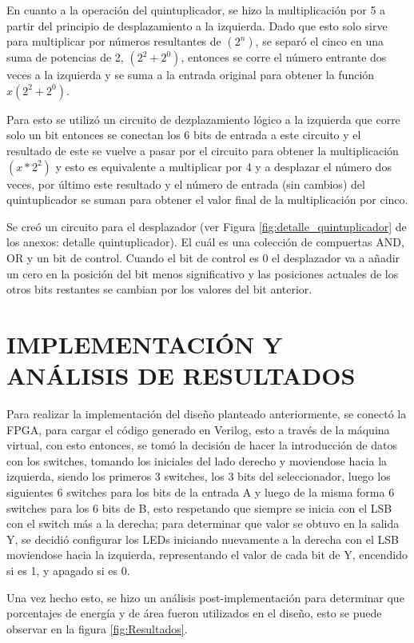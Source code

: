 \documentclass[journal,trans]{IEEEtran}
\begin{document}
En cuanto a la operación del quintuplicador, se hizo la multiplicación por 5 a partir del principio de desplazamiento a la izquierda. Dado que esto solo sirve para multiplicar por números resultantes de \((2^n)\), se separó el cinco en una suma de potencias de 2, \((2^2+2^0)\), entonces se corre el número entrante dos veces a la izquierda y se suma a la entrada original para obtener la función \(x(2^2+2^0)\).

Para esto se utilizó un circuito de dezplazamiento lógico a la izquierda que corre solo un bit entonces se conectan los 6 bits de entrada a este circuito y el resultado de este se vuelve a pasar por el circuito para obtener la multiplicación \((x*2^2)\) y esto es equivalente a multiplicar por 4 y a desplazar el número dos veces, por último este resultado y el número de entrada (sin cambios) del quintuplicador se suman para obtener el valor final de la multiplicación por cinco. 

Se creó un circuito para el desplazador (ver Figura \ref{fig:detalle_quintuplicador} de los anexos: detalle quintuplicador). El cuál es una colección de compuertas AND, OR y un bit de control. Cuando el bit de control es 0 el desplazador va a añadir un cero en la posición del bit menos significativo y las posiciones actuales de los otros bits restantes se cambian por los valores del bit anterior.

\section{IMPLEMENTACIÓN Y ANÁLISIS DE RESULTADOS}

Para realizar la implementación del diseño planteado anteriormente, se conectó la FPGA, para cargar el código generado en Verilog, esto a través de la máquina virtual, con esto entonces, se tomó la decisión de hacer la introducción de datos con los switches, tomando los iniciales del lado derecho y moviendose hacia la izquierda, siendo los primeros 3 switches, los 3 bits del seleccionador, luego los siguientes 6 switches para los bits de la entrada A y luego de la misma forma 6 switches para los 6 bits de B, esto respetando que siempre se inicia con el LSB con el switch más a la derecha; para determinar que valor se obtuvo en la salida Y, se decidió configurar los LEDs iniciando nuevamente a la derecha con el LSB moviendose hacia la izquierda, representando el valor de cada bit de Y, encendido si es 1, y apagado si es 0.

Una vez hecho esto, se hizo un análisis post-implementación para determinar que porcentajes de energía y de área fueron utilizados en el diseño, esto se puede observar en la figura \ref{fig:Resultados}.
\end{document}
